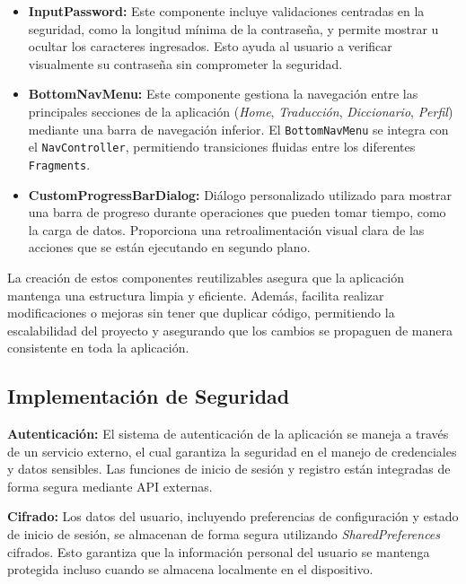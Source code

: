 \begin{itemize}
    \item \textbf{InputPassword:} Este componente incluye validaciones centradas en la seguridad, como la longitud mínima de la contraseña, y permite mostrar u ocultar los caracteres ingresados. Esto ayuda al usuario a verificar visualmente su contraseña sin comprometer la seguridad.

    \item \textbf{BottomNavMenu:} Este componente gestiona la navegación entre las principales secciones de la aplicación (\textit{Home}, \textit{Traducción}, \textit{Diccionario}, \textit{Perfil}) mediante una barra de navegación inferior. El \texttt{BottomNavMenu} se integra con el \texttt{NavController}, permitiendo transiciones fluidas entre los diferentes \texttt{Fragments}.

    \item \textbf{CustomProgressBarDialog:} Diálogo personalizado utilizado para mostrar una barra de progreso durante operaciones que pueden tomar tiempo, como la carga de datos. Proporciona una retroalimentación visual clara de las acciones que se están ejecutando en segundo plano.
\end{itemize}

La creación de estos componentes reutilizables asegura que la aplicación mantenga una estructura limpia y eficiente. Además, facilita realizar modificaciones o mejoras sin tener que duplicar código, permitiendo la escalabilidad del proyecto y asegurando que los cambios se propaguen de manera consistente en toda la aplicación.



\subsection{Implementación de Seguridad}

\textbf{Autenticación:} El sistema de autenticación de la aplicación se maneja a través de un servicio externo, el cual garantiza la seguridad en el manejo de credenciales y datos sensibles. Las funciones de inicio de sesión y registro están integradas de forma segura mediante API externas.

\textbf{Cifrado:} Los datos del usuario, incluyendo preferencias de configuración y estado de inicio de sesión, se almacenan de forma segura utilizando \textit{SharedPreferences} cifrados. Esto garantiza que la información personal del usuario se mantenga protegida incluso cuando se almacena localmente en el dispositivo.

